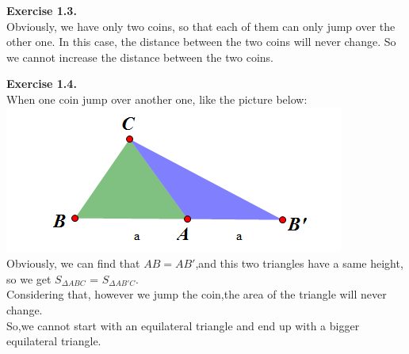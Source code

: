 \documentclass{article}
\begin{document}
\begin{flushleft}
\textbf{Exercise 1.3.} \\
Obviously, we have only two coins, so that each of them can only jump over the other one.
In this case, the distance between the two coins will never change. So we cannot increase the 
distance between the two coins.

\textbf{Exercise 1.4.} \\
When one coin jump over another one, like the picture below:
\includegraphics[scale=0.7]{1_3_1.png}\\
Obviously, we can find that $AB = AB'$,and this two triangles have a same height, so we get  $S_{\Delta ABC}$ = $S_{\Delta AB'C}$.\\
Considering that, however we jump the coin,the area of the triangle will never change.\\
So,we cannot start with an equilateral triangle and end up with a bigger equilateral triangle.


\end{flushleft}
\end{document}

